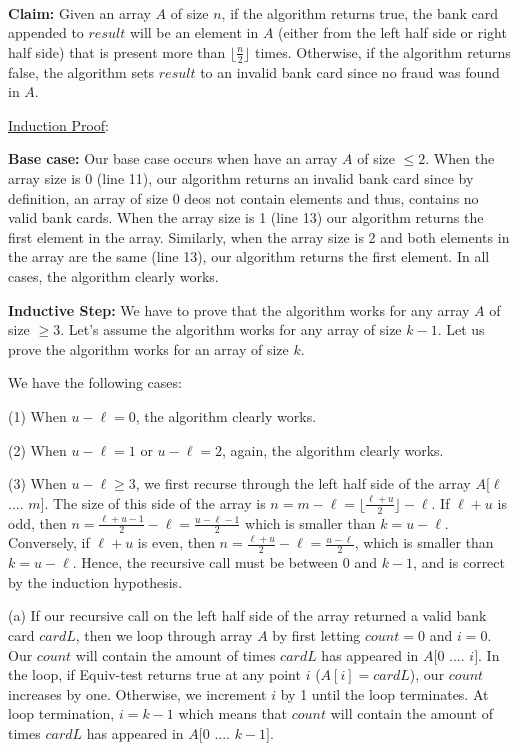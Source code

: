 \documentclass[11pt]{article}
\begin{document}
\begin{itemize}
\-\\
{\bf Claim:} Given an array $A$ of size $n$, if the algorithm returns true, the bank card appended to $result$ will be an element in $A$ (either from the left half side or right half side) that is present more than $\lfloor \frac{n}{2} \rfloor$ times. Otherwise, if the algorithm returns false, the algorithm sets $result$ to an invalid bank card since no fraud was found in $A$.

\underline{Induction Proof}:

{\bf Base case:} Our base case occurs when have an array $A$ of size $\leq 2$. When the array size is 0 (line 11), our algorithm returns an invalid bank card since by definition, an array of size 0 deos not contain elements and thus, contains no valid bank cards. When the array size is 1 (line 13) our algorithm returns the first element in the array. Similarly, when the array size is 2 and both elements in the array are the same (line 13), our algorithm returns the first element. In all cases, the algorithm clearly works.

{\bf Inductive Step:} We have to prove that the algorithm works for any array $A$ of size $\geq 3$. Let's assume the algorithm works for any array of size $k - 1$. Let us prove the algorithm works for an array of size $k$.

We have the following cases:

(1) When $u - \ell = 0$, the algorithm clearly works.

(2) When $u - \ell = 1$ or $u - \ell = 2$, again, the algorithm clearly works.

(3) When $u - \ell \geq 3$, we first recurse through the left half side of the array $A[\ell$ .... $m]$. The size of this side of the array is $n = m - \ell = \lfloor \frac{\ell + u}{2} \rfloor - \ell$. If $\ell + u$ is odd, then $n = \frac{\ell + u - 1}{2}- \ell = \frac{u-\ell-1}{2}$ which is smaller than $k=u -\ell$. Conversely, if $\ell + u$ is even, then $n=\frac{\ell + u}{2} - \ell = \frac{u-\ell}{2}$, which is smaller than $k=u-\ell$. Hence, the recursive call must be between $0$ and $k-1$, and is correct by the induction hypothesis.

\phantom{(3) } (a) If our recursive call on the left half side of the array returned a valid bank card $cardL$, then we loop through array $A$ by first letting $count = 0$ and $i = 0$. Our $count$ will contain the amount of times $cardL$ has appeared in $A[0$ .... $i]$. In the loop, if Equiv-test returns true at any point $i$ ($A[i] = cardL$), our $count$ increases by one. Otherwise, we increment $i$ by 1 until the loop terminates. At loop termination, $i = k-1$ which means that $count$ will contain the amount of times $cardL$ has appeared in $A[0$ .... $k - 1]$.


\end{itemize}
\end{document}
